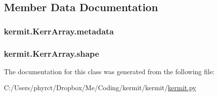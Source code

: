 \subsection{Member Data Documentation}
\subsubsection[{\texorpdfstring{metadata}{metadata}}]{\setlength{\rightskip}{0pt plus 5cm}kermit.\+Kerr\+Array.\+metadata}\hypertarget{classkermit_1_1_kerr_array_a884b10ce1536dc07c4a9ac9346976c22}{}\label{classkermit_1_1_kerr_array_a884b10ce1536dc07c4a9ac9346976c22}
\subsubsection[{\texorpdfstring{shape}{shape}}]{\setlength{\rightskip}{0pt plus 5cm}kermit.\+Kerr\+Array.\+shape}\hypertarget{classkermit_1_1_kerr_array_af46ae97efa0085db5e4ed9511ebac823}{}\label{classkermit_1_1_kerr_array_af46ae97efa0085db5e4ed9511ebac823}


The documentation for this class was generated from the following file\+:\begin{DoxyCompactItemize}
\item 
C\+:/\+Users/phyrct/\+Dropbox/\+Me/\+Coding/kermit/kermit/\hyperlink{kermit_8py}{kermit.\+py}\end{DoxyCompactItemize}
